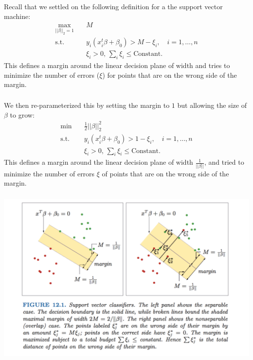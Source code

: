 \documentclass[xetex,mathserif,serif,aspectratio=169]{beamer}
\begin{document}
\begin{frame}[fragile] \frametitle{} \oldB \small

Recall that we settled on the following definition for a
the support vector machine:
\begin{align*}
\max_{|| \beta ||_2 = 1} \quad &  M \\
\text{s.t.} \quad & y_i (x_i^t \beta + \beta_0) > M - \xi_i, \quad i = 1, \ldots, n \\
&\xi_i > 0, \, \sum_i \xi_i \leq \text{Constant}.
\end{align*}
This defines a margin around the linear decision plane of width
and tries to minimize the number of errors ($\xi$) for
points that are on the wrong side of the margin.

\end{frame}

\begin{frame}[fragile] \frametitle{} \oldB \small

We then re-parameterized this by setting the margin to
$1$ but allowing the size of $\beta$ to grow:
\begin{align*}
\min \quad &  \frac{1}{2} || \beta ||_2^2 \\
\text{s.t.} \quad & y_i (x_i^t \beta + \beta_0) > 1 - \xi_i, \quad i = 1, \ldots, n \\
&\xi_i > 0, \, \sum_i \xi_i \leq \text{Constant}.
\end{align*}
This defines a margin around the linear decision plane of width
$\frac{1}{|| \beta ||}$, and tried to minimize the number of errors
$\xi$ of points that are on the wrong side of the margin.

\end{frame}

\begin{frame}[fragile] \frametitle{} \oldB \small

\begin{center}
\includegraphics[height=0.7\textheight]{img/slack.pdf}
\end{center}

\end{frame}
\end{document}
